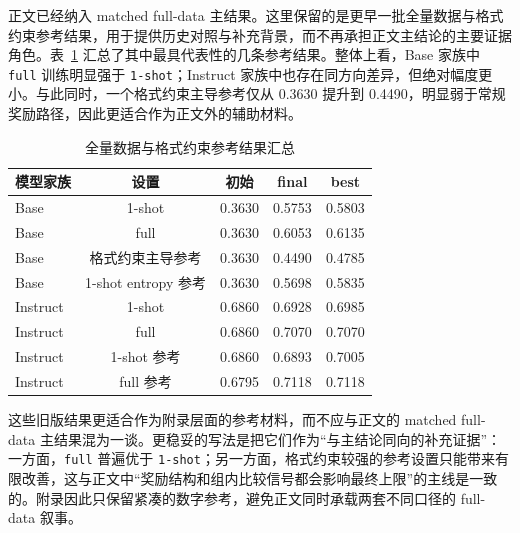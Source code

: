 \documentclass[12pt,a4paper]{ctexart}
\begin{document}
正文已经纳入 matched full-data 主结果。这里保留的是更早一批全量数据与格式约束参考结果，用于提供历史对照与补充背景，而不再承担正文主结论的主要证据角色。表~\ref{tab:full-data-reference-runs-cn} 汇总了其中最具代表性的几条参考结果。整体上看，Base 家族中 \texttt{full} 训练明显强于 \texttt{1-shot}；Instruct 家族中也存在同方向差异，但绝对幅度更小。与此同时，一个格式约束主导参考仅从 0.3630 提升到 0.4490，明显弱于常规奖励路径，因此更适合作为正文外的辅助材料。

\begin{table}[H]
    \centering
    \caption{全量数据与格式约束参考结果汇总}
    \label{tab:full-data-reference-runs-cn}
    \small
    \begin{tabular}{lcccc}
        \toprule
        模型家族 & 设置 & 初始 & final & best \\
        \midrule
        Base & 1-shot & 0.3630 & 0.5753 & 0.5803 \\
        Base & full & 0.3630 & 0.6053 & 0.6135 \\
        Base & 格式约束主导参考 & 0.3630 & 0.4490 & 0.4785 \\
        Base & 1-shot entropy 参考 & 0.3630 & 0.5698 & 0.5835 \\
        Instruct & 1-shot & 0.6860 & 0.6928 & 0.6985 \\
        Instruct & full & 0.6860 & 0.7070 & 0.7070 \\
        Instruct & 1-shot 参考 & 0.6860 & 0.6893 & 0.7005 \\
        Instruct & full 参考 & 0.6795 & 0.7118 & 0.7118 \\
        \bottomrule
    \end{tabular}
\end{table}

这些旧版结果更适合作为附录层面的参考材料，而不应与正文的 matched full-data 主结果混为一谈。更稳妥的写法是把它们作为“与主结论同向的补充证据”：一方面，\texttt{full} 普遍优于 \texttt{1-shot}；另一方面，格式约束较强的参考设置只能带来有限改善，这与正文中“奖励结构和组内比较信号都会影响最终上限”的主线是一致的。附录因此只保留紧凑的数字参考，避免正文同时承载两套不同口径的 full-data 叙事。
\end{document}
